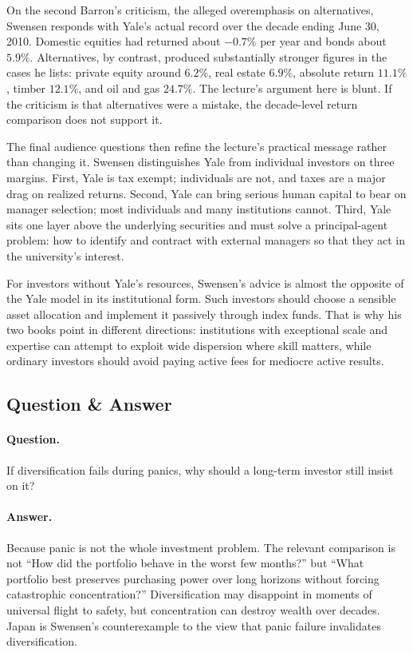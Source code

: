 On the second Barron's criticism, the alleged overemphasis on alternatives, Swensen responds with Yale's actual record over the decade ending June 30, 2010. Domestic equities had returned about \(-0.7\%\) per year and bonds about \(5.9\%\). Alternatives, by contrast, produced substantially stronger figures in the cases he lists: private equity around \(6.2\%\), real estate \(6.9\%\), absolute return \(11.1\%\), timber \(12.1\%\), and oil and gas \(24.7\%\). The lecture's argument here is blunt. If the criticism is that alternatives were a mistake, the decade-level return comparison does not support it.

The final audience questions then refine the lecture's practical message rather than changing it. Swensen distinguishes Yale from individual investors on three margins. First, Yale is tax exempt; individuals are not, and taxes are a major drag on realized returns. Second, Yale can bring serious human capital to bear on manager selection; most individuals and many institutions cannot. Third, Yale sits one layer above the underlying securities and must solve a principal-agent problem: how to identify and contract with external managers so that they act in the university's interest.

For investors without Yale's resources, Swensen's advice is almost the opposite of the Yale model in its institutional form. Such investors should choose a sensible asset allocation and implement it passively through index funds. That is why his two books point in different directions: institutions with exceptional scale and expertise can attempt to exploit wide dispersion where skill matters, while ordinary investors should avoid paying active fees for mediocre active results.

\subsection{Question \& Answer}

\paragraph{Question.} If diversification fails during panics, why should a long-term investor still insist on it?

\paragraph{Answer.} Because panic is not the whole investment problem. The relevant comparison is not ``How did the portfolio behave in the worst few months?'' but ``What portfolio best preserves purchasing power over long horizons without forcing catastrophic concentration?'' Diversification may disappoint in moments of universal flight to safety, but concentration can destroy wealth over decades. Japan is Swensen's counterexample to the view that panic failure invalidates diversification.

